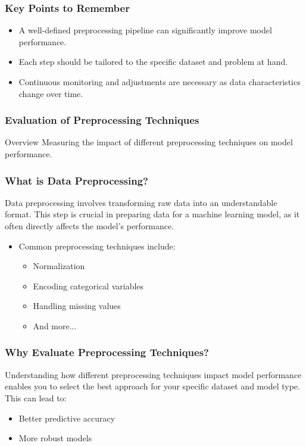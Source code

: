\documentclass[aspectratio=169]{beamer}
\begin{document}
\begin{frame}[fragile]
    \frametitle{Key Points to Remember}
    \begin{itemize}
        \item A well-defined preprocessing pipeline can significantly improve model performance.
        \item Each step should be tailored to the specific dataset and problem at hand.
        \item Continuous monitoring and adjustments are necessary as data characteristics change over time.
    \end{itemize}
\end{frame}

\begin{frame}[fragile]
    \frametitle{Evaluation of Preprocessing Techniques}
    \begin{block}{Overview}
        Measuring the impact of different preprocessing techniques on model performance.
    \end{block}
\end{frame}

\begin{frame}[fragile]
    \frametitle{What is Data Preprocessing?}
    Data preprocessing involves transforming raw data into an understandable format. 
    This step is crucial in preparing data for a machine learning model, as it often 
    directly affects the model's performance. 

    \begin{itemize}
        \item Common preprocessing techniques include:
        \begin{itemize}
            \item Normalization
            \item Encoding categorical variables
            \item Handling missing values
            \item And more...
        \end{itemize}
    \end{itemize}
\end{frame}

\begin{frame}[fragile]
    \frametitle{Why Evaluate Preprocessing Techniques?}
    Understanding how different preprocessing techniques impact model performance 
    enables you to select the best approach for your specific dataset and model type. 
    This can lead to:
    
    \begin{itemize}
        \item Better predictive accuracy
        \item More robust models
    \end{itemize}
\end{frame}
\end{document}
